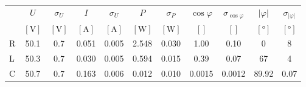 \begin{tabular}{
    l
    S[table-format=2.1]
    S[table-format=1.1]
    S[table-format=1.4]
    S[table-format=1.4]
    S[table-format=1.2]
    S[table-format=1.2]
    S[table-format=1.2]
    S[table-format=1.2]
    S[table-format=2.1]
    S[table-format=2.1]
} \toprule
  & {$U$}            & {$\sigma_U$}     & {$I$}              & {$\sigma_U$}       & {$P$}            & {$\sigma_P$}     & {$\cos \varphi$} & {$\sigma_{\cos \varphi}$} & {$|\varphi|$}      & {$\sigma_{|\varphi|}$} \\
  & {$[\si{\volt}]$} & {$[\si{\volt}]$} & {$[\si{\ampere}]$} & {$[\si{\ampere}]$} & {$[\si{\watt}]$} & {$[\si{\watt}]$} & {$[]$}           & {$[]$}                    & {$[\si{\degree}]$} & {$[\si{\degree}]$}     \\ \midrule
R & 50.1             & 0.7              & 0.051              & 0.005              & 2.548            & 0.030            & 1.00             & 0.10                      & 0                  & 8                      \\
L & 50.3             & 0.7              & 0.030              & 0.005              & 0.594            & 0.015            & 0.39             & 0.07                      & 67                 & 4                      \\
C & 50.7             & 0.7              & 0.163              & 0.006              & 0.012            & 0.010            & 0.0015           & 0.0012                    & 89.92              & 0.07                   \\ \bottomrule
\end{tabular}

